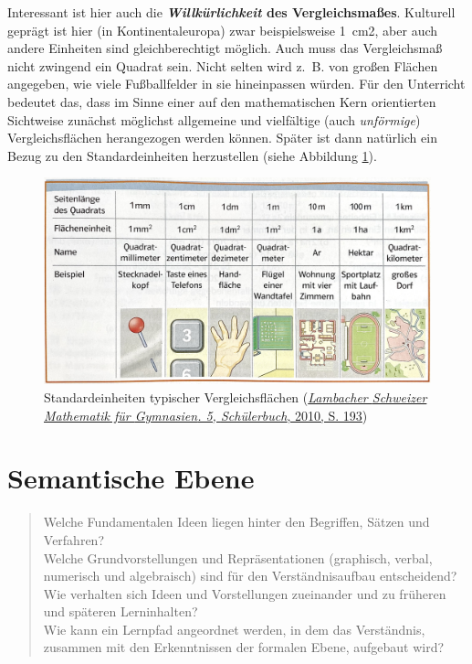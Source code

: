 \documentclass[
  ngerman,
]{scrbook}
\theoremstyle{definition}
\theoremstyle{definition}
\theoremstyle{definition}
\theoremstyle{definition}
\theoremstyle{remark}
\begin{document}
Interessant ist hier auch die \textbf{\emph{Willkürlichkeit} des Vergleichsmaßes}. Kulturell geprägt ist hier (in Kontinentaleuropa) zwar beispielsweise 1~cm2, aber auch andere Einheiten sind gleichberechtigt möglich. Auch muss das Vergleichsmaß nicht zwingend ein Quadrat sein. Nicht selten wird z.~B. von großen Flächen angegeben, wie viele Fußballfelder in sie hineinpassen würden. Für den Unterricht bedeutet das, dass im Sinne einer auf den mathematischen Kern orientierten Sichtweise zunächst möglichst allgemeine und vielfältige (auch \emph{unförmige}) Vergleichsflächen herangezogen werden können. Später ist dann natürlich ein Bezug zu den Standardeinheiten herzustellen (siehe Abbildung \ref{fig:FlaecheEinheiten}).



\begin{figure}

{\centering \includegraphics[width=0.75\linewidth]{pictures/5-Einheiten} 

}

\caption{Standardeinheiten typischer Vergleichsflächen (\protect\hyperlink{ref-Lambacher2010}{\emph{Lambacher {Schweizer} {Mathematik} für {Gymnasien}. 5, {Schülerbuch}}, 2010, S. 193})}\label{fig:FlaecheEinheiten}
\end{figure}

\hypertarget{semantische-ebene-1}{%
\section{Semantische Ebene}\label{semantische-ebene-1}}

\begin{quote}
Welche Fundamentalen Ideen liegen hinter den Begriffen, Sätzen und Verfahren?\\
Welche Grundvorstellungen und Repräsentationen (graphisch, verbal, numerisch und algebraisch) sind für den Verständnisaufbau entscheidend?\\
Wie verhalten sich Ideen und Vorstellungen zueinander und zu früheren und späteren Lerninhalten?\\
Wie kann ein Lernpfad angeordnet werden, in dem das Verständnis, zusammen mit den Erkenntnissen der formalen Ebene, aufgebaut wird?
\end{quote}
\end{document}
